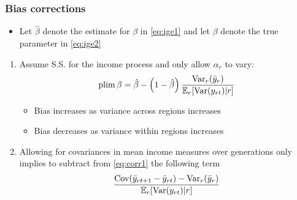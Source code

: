 \begin{frame}
	\frametitle{Bias corrections}
	\begin{itemize}
	\item Let $\hat{\beta}$ denote the estimate for $\beta$ in \eqref{eq:ige1}  and let $\beta$ denote the true parameter in \eqref{eq:ige2}	
	\end{itemize}
 
		\begin{enumerate}
			\item Assume S.S. for the income process and only allow $\alpha_{r}$ to vary:
			\begin{equation}
			\operatorname{plim} \beta = \hat{\beta} - \left(1 - \hat{\beta} \right) \frac{\operatorname{Var}_{r}(\bar{y}_{r})}{\mathbb{E}_{r}[\operatorname{Var}(y_{rt})|r]} \label{eq:corr1}
			\end{equation}
				\begin{itemize}
				\item Bias increases as variance across regions increases
				\item Bias decreases as variance within regions increases
				\end{itemize}				 
			\item Allowing for covariances in mean income measures over generations only implies to subtract from \eqref{eq:corr1} the following term
			\begin{equation}
\frac{\operatorname{Cov} ( \bar{y}_{rt+1} - \bar{y}_{rt} ) - \operatorname{Var}_{r}(\bar{y}_{r})}{\mathbb{E}_{r}[\operatorname{Var}(y_{rt})|r]}
			\end{equation}
		\end{enumerate}
\end{frame}




